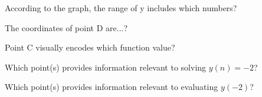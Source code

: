 \documentclass{ximera}
\begin{document}
\begin{exercise}
According to the graph, the range of y includes which numbers?

\begin{selectAll}
\end{selectAll}
\end{exercise}







\begin{exercise}
The coordinates of point D are...?

\begin{multipleChoice}
\end{multipleChoice}
\end{exercise}






\begin{exercise}
Point C visually encodes which function value?

\begin{multipleChoice}
\end{multipleChoice}
\end{exercise}




\begin{exercise}
Which point(s) provides information relevant to solving $y(n) = -2$?

\begin{selectAll}
\end{selectAll}
\end{exercise}





\begin{exercise}
Which point(s) provides information relevant to evaluating $y(-2)$?

\begin{selectAll}
\end{selectAll}
\end{exercise}
\end{document}
